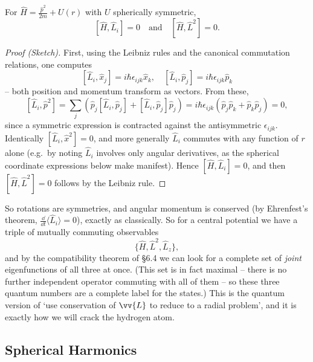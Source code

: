 \begin{proposition}
    For $\hat{H} = \frac{\hat{p}^2}{2m} + U(r)$ with $U$ spherically symmetric,
    $$
    [\hat{H}, \hat{L}_i] = 0 \quad \text{and} \quad [\hat{H}, \hat{L}^2] = 0.
    $$
\end{proposition}
\begin{proof}[Proof (Sketch)]
    First, using the Leibniz rules and the canonical commutation relations, one computes
    $$
    [\hat{L}_i, \hat{x}_j] = i \hbar \epsilon_{ijk} \hat{x}_k, \quad [\hat{L}_i, \hat{p}_j] = i \hbar \epsilon_{ijk} \hat{p}_k
    $$
    -- both position and momentum transform as vectors. From these,
    $$
    [\hat{L}_i, \hat{p}^2] = \sum_j \left( \hat{p}_j [\hat L_i, \hat p_j] + [\hat L_i, \hat p_j] \hat p_j \right) = i\hbar \epsilon_{ijk}\left( \hat p_j \hat p_k + \hat p_k \hat p_j \right) = 0,
    $$
    since a symmetric expression is contracted against the antisymmetric $\epsilon_{ijk}$. Identically $[\hat{L}_i, \hat{x}^2] = 0$, and more generally $\hat{L}_i$ commutes with any function of $r$ alone (e.g.\ by noting $\hat{L}_i$ involves only angular derivatives, as the spherical coordinate expressions below make manifest). Hence $[\hat{H}, \hat{L}_i] = 0$, and then $[\hat{H}, \hat{L}^2] = 0$ follows by the Leibniz rule.
\end{proof}

So rotations are symmetries, and angular momentum is conserved (by Ehrenfest's theorem, $\frac{\dd}{\dd t}\langle \hat L_i \rangle = 0$), exactly as classically. So for a central potential we have a triple of mutually commuting observables
$$
\{ \hat{H}, \hat{L}^2, \hat{L}_z \},
$$
and by the compatibility theorem of \S 6.4 we can look for a complete set of \emph{joint} eigenfunctions of all three at once. (This set is in fact maximal -- there is no further independent operator commuting with all of them -- so these three quantum numbers are a complete label for the states.) This is the quantum version of `use conservation of $\vv{L}$ to reduce to a radial problem', and it is exactly how we will crack the hydrogen atom.

\subsection{Spherical Harmonics}

